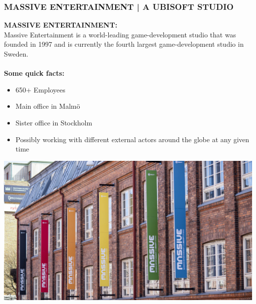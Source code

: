 \documentclass[xcolor=svgnames,10pt,aspectratio=1610]{beamer}
\begin{document}
\begin{frame}
  \frametitle{MASSIVE ENTERTAINMENT | A UBISOFT STUDIO}
  \begin{minipage}{.43\textwidth}
    \vspace{-1.5cm}
    \textbf{MASSIVE ENTERTAINMENT:} \\
    Massive Entertainment is a world-leading game-development studio that was
    founded in 1997 and is currently the fourth largest game-development studio
    in Sweden. \\ \\
    \textbf{Some quick facts:}
    \begin{itemize}
      \item{650+ Employees}
      \item{Main office in Malmö}
      \item{Sister office in Stockholm}
      \item{
          Possibly working with different external actors around the globe at any
          given time
        }
    \end{itemize}
  \end{minipage}
  \begin{minipage}{.49\textwidth}
    \hspace{0.89cm}\includegraphics{img/massive_outside.jpg}
  \end{minipage}
\end{frame}
\end{document}
